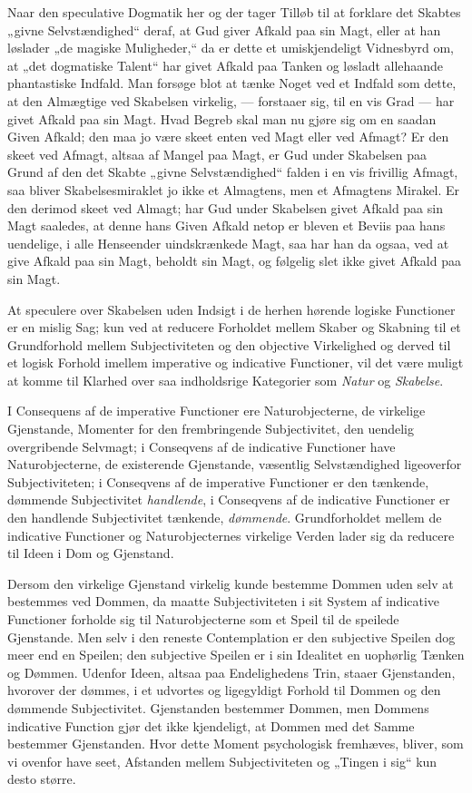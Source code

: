 \documentclass[12pt]{book}
\newcommand{\opage}[1]{\marginnote{\footnotesize\textit{[#1]}}}
\begin{document}
Naar den speculative Dogmatik her og der tager Tilløb
til at forklare det Skabtes „givne Selvstændighed“ deraf, at
Gud giver Afkald paa sin Magt, eller at han løslader „de
magiske Muligheder,“ da er dette et umiskjendeligt Vidnesbyrd
om, at „det dogmatiske Talent“ har givet Afkald paa
Tanken og løsladt allehaande phantastiske Indfald. Man
forsøge blot at tænke Noget ved et Indfald som dette, at den
Almægtige ved Skabelsen virkelig, --- forstaaer sig, til en vis
Grad --- har givet Afkald paa sin Magt. Hvad Begreb skal
man nu gjøre sig om en saadan Given Afkald; den maa jo
være skeet enten ved Magt eller ved Afmagt? Er den skeet
ved Afmagt, altsaa af Mangel paa Magt, er Gud under
Skabelsen paa Grund af den det Skabte „givne Selvstændighed“
falden i en vis frivillig Afmagt, saa bliver Skabelsesmiraklet
jo ikke et Almagtens, men et Afmagtens Mirakel.
Er den derimod skeet ved Almagt; har Gud under Skabelsen
givet Afkald paa sin Magt saaledes, at denne hans Given
Afkald netop er bleven et Beviis paa hans uendelige, i alle
Henseender uindskrænkede Magt, saa har han da ogsaa, ved at
give Afkald paa sin Magt, beholdt sin Magt, og følgelig slet
ikke givet Afkald paa sin Magt.

At speculere over Skabelsen uden Indsigt i de herhen
hørende logiske Functioner er en mislig Sag; kun ved at reducere
Forholdet mellem Skaber og Skabning til et Grundforhold
mellem Subjectiviteten og den objective Virkelighed
og derved til et logisk Forhold imellem imperative og
indi\opage{165}cative Functioner, vil det være muligt at komme til Klarhed
over saa indholdsrige Kategorier som \emph{Natur} og \emph{Skabelse}.

I Consequens af de imperative Functioner ere Naturobjecterne,
de virkelige Gjenstande, Momenter for den frembringende
Subjectivitet, den uendelig overgribende Selvmagt;
i Conseqvens af de indicative Functioner have Naturobjecterne,
de existerende Gjenstande, væsentlig Selvstændighed
ligeoverfor Subjectiviteten; i Conseqvens af de imperative Functioner
er den tænkende, dømmende Subjectivitet \emph{handlende},
i Conseqvens af de indicative Functioner er den handlende
Subjectivitet tænkende, \emph{dømmende}. Grundforholdet mellem
de indicative Functioner og Naturobjecternes virkelige Verden
lader sig da reducere til Ideen i Dom og Gjenstand.

Dersom den virkelige Gjenstand virkelig kunde bestemme
Dommen uden selv at bestemmes ved Dommen, da maatte
Subjectiviteten i sit System af indicative Functioner forholde
sig til Naturobjecterne som et Speil til de speilede Gjenstande.
Men selv i den reneste Contemplation er den subjective
Speilen dog meer end en Speilen; den subjective Speilen
er i sin Idealitet en uophørlig Tænken og Dømmen. Udenfor
Ideen, altsaa paa Endelighedens Trin, staaer Gjenstanden,
hvorover der dømmes, i et udvortes og ligegyldigt Forhold
til Dommen og den dømmende Subjectivitet. Gjenstanden
bestemmer Dommen, men Dommens indicative Function gjør
det ikke kjendeligt, at Dommen med det Samme bestemmer
Gjenstanden. Hvor dette Moment psychologisk fremhæves,
bliver, som vi ovenfor have seet, Afstanden mellem Subjectiviteten
og „Tingen i sig“ kun desto større.
\end{document}
